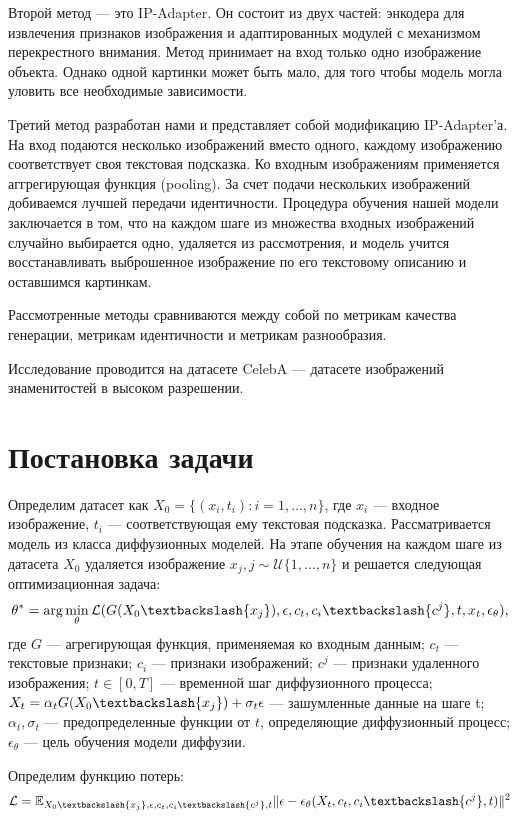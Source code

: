 \documentclass{article}
\begin{document}
Второй метод --- это IP-Adapter. Он состоит из двух частей: энкодера для извлечения признаков изображения и адаптированных модулей с механизмом перекрестного внимания. Метод принимает на вход только одно изображение объекта. Однако одной картинки может быть мало, для того чтобы модель могла уловить все необходимые зависимости. 

Третий метод разработан нами и представляет собой модификацию IP-Adapter’а. На вход подаются несколько изображений вместо одного, каждому изображению соответствует своя текстовая подсказка. Ко входным изображениям применяется аггрегирующая функция (pooling). За счет подачи нескольких изображений добиваемся лучшей передачи идентичности. Процедура обучения нашей модели заключается в том, что на каждом шаге из множества входных изображений случайно выбирается одно, удаляется из рассмотрения, и модель учится восстанавливать выброшенное изображение по его текстовому описанию и оставшимся картинкам. 

Рассмотренные методы сравниваются между собой по метрикам качества генерации, метрикам идентичности и метрикам разнообразия.

Исследование проводится на датасете CelebA --- датасете изображений знаменитостей в высоком разрешении. 

\section{Постановка задачи}
Определим датасет как $X_0=\{ (x_{i}, t_{i}): i = 1, \dots, n\}$, где $x_{i}$ --- входное изображение, $t_{i}$ --- соответствующая ему текстовая подсказка. Рассматривается модель из класса диффузионных моделей. На этапе обучения на каждом шаге из датасета $X_0$ удаляется изображение $x_{j}, j \sim \mathcal{U}\{1, \dots, n\}$ и решается следующая оптимизационная задача:
$$ \theta^* = \arg \min_{\theta}\mathcal{L}(G(X_0 \textbackslash \{x_{j}\}), \epsilon, c_{t}, c_{i} \textbackslash \{c^j\}, t, x_{t}, \epsilon_{\theta}), $$
где $G$ --- агрегирующая функция, применяемая ко входным данным; $c_{t}$ --- текстовые признаки; $c_{i}$ --- признаки изображений; $c^j$ --- признаки удаленного изображения; $t \in [0, T]$ --- временной шаг диффузионного процесса; $X_{t} = \alpha_t G(X_0 \textbackslash \{x_{j}\}) + \sigma_t \epsilon$ --- зашумленные данные на шаге t; $\alpha_t, \sigma_t$ --- предопределенные функции от $t$, определяющие диффузионный процесс; $\epsilon_{\theta}$ --- цель обучения модели диффузии. 

Определим функцию потерь: 
$$ \mathcal{L} = \mathbb{E}_{X_0 \textbackslash \{x_{j}\}, \epsilon, c_t, c_{i} \textbackslash \{c^j\}, t} \|\epsilon - \epsilon_{\theta}(X_t, c_t, c_{i} \textbackslash \{c^j\}, t)\|^2$$
\end{document}
